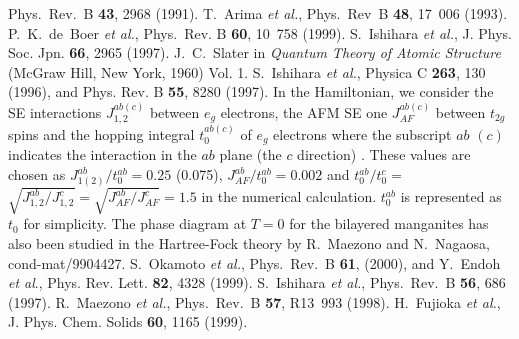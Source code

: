 \begin{references}
Phys.\ Rev.\ B {\bf 43}, 2968 (1991).  
%
T.~Arima {\it et al.}, 
Phys.~Rev~B {\bf 48}, 17~006 (1993). 
%
P.~K.~de~Boer {\it et al.}, 
Phys.~Rev. B {\bf 60}, 10~758 (1999). 
%
S.~Ishihara {\it et al.}, 
J. Phys. Soc. Jpn. {\bf 66}, 2965 (1997). 
%
J.~C.~Slater in {\em Quantum Theory of Atomic Structure} 
(McGraw Hill, New York, 1960) Vol. 1. 
%
S.~Ishihara {\it et al.}, 
Physica C {\bf 263}, 130 (1996), and Phys. Rev. B {\bf 55}, 8280 (1997). 
%
In the Hamiltonian, we consider the SE interactions $J_{1,2}^{ab(c)}$ between $e_g$ electrons, the AFM SE one 
$J_{AF}^{ab(c)}$ between $t_{2g}$ spins and 
the hopping integral $t_0^{ab(c)}$ of $e_g$ electrons 
where the subscript $ab$ $(c)$ indicates the interaction in 
the $ab$ plane (the $c$ direction) \protect\cite{ishihara,ishihara2}. 
These values are chosen as 
$J_{1(2)}^{ab}/t_0^{ab}=0.25$ (0.075), $J_{AF}^{ab}/t_0^{ab}=0.002$ and   
$t_0^{ab}/t_0^{c}=$$\sqrt{J_{1,2}^{ab}/J_{1,2}^{c}}=\sqrt{J_{AF}^{ab}/J_{AF}^{c}}=1.5$ 
in the numerical calculation. $t_0^{ab}$ is represented as $t_0$ for simplicity. 
%
The phase diagram at $T=0$ for the bilayered manganites 
has also been studied in the Hartree-Fock theory by  
R.~Maezono and N.~Nagaosa, cond-mat/9904427. 
%
S.~Okamoto {\it et al.}, 
Phys.~Rev.~B {\bf 61}, (2000), 
and 
Y.~Endoh {\it et al}., 
Phys. Rev. Lett. {\bf 82}, 4328 (1999). 
%
S.~Ishihara {\it et al.}, 
Phys.~Rev.~B {\bf 56}, 686 (1997). 
%
R.~Maezono {\it et al.}, 
Phys.~Rev.~B {\bf 57}, R13~993 (1998). 
%
H.~Fujioka {\it et al.}, 
J. Phys. Chem. Solids {\bf 60}, 1165 (1999). 
%
\end{references}
%
%
%

